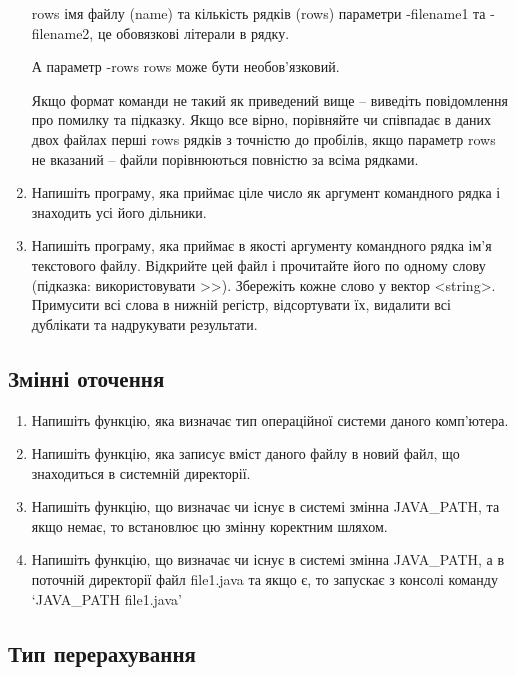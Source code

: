 \documentclass[]{article}
\begin{document}
\begin{enumerate}
rows імя файлу (name) та кількість рядків (rows) параметри -filename1 та
-filename2, це обовязкові літерали в рядку.

А параметр -rows rows може бути необов'язковий.

Якщо формат команди не такий як приведений вище -- виведіть повідомлення
про помилку та підказку. Якщо все вірно, порівняйте чи співпадає в даних
двох файлах перші rows рядків з точністю до пробілів, якщо параметр rows
не вказаний -- файли порівнюються повністю за всіма рядками.
\item
Напишіть програму, яка приймає ціле число як аргумент командного рядка і
знаходить усі його дільники.
\item
Напишіть програму, яка приймає в якості аргументу командного рядка ім'я
текстового файлу. Відкрийте цей файл і прочитайте його по одному слову
(підказка: використовувати \textgreater{}\textgreater{}). Збережіть
кожне слово у вектор \textless{}string\textgreater{}. Примусити всі
слова в нижній регістр, відсортувати їх, видалити всі дублікати та
надрукувати результати.
\end{enumerate}

\subsection{Змінні оточення}

\begin{enumerate}
\item
Напишіть функцію, яка визначає тип операційної системи даного
комп'ютера.
\item
Напишіть функцію, яка записує вміст даного файлу в новий файл, що
знаходиться в системній директорії.
\item
Напишіть функцію, що визначає чи існує в системі змінна JAVA\_PATH, та
якщо немає, то встановлює цю змінну коректним шляхом.
\item
Напишіть функцію, що визначає чи існує в системі змінна JAVA\_PATH, а в
поточній директорії файл file1.java та якщо є, то запускає з консолі
команду `JAVA\_PATH file1.java'
\end{enumerate}

\subsection{Тип перерахування}
\end{document}

